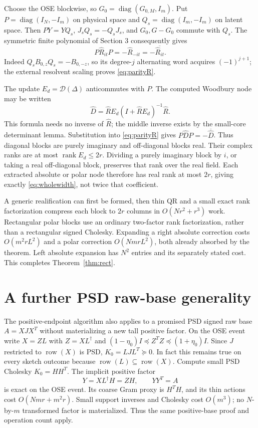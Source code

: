 \documentclass[11pt]{article}
\numberwithin{equation}{section}
\newcommand{\rank}{\operatorname{rank}}
\newcommand{\diag}{\operatorname{diag}}
\begin{document}
Choose the OSE blockwise, so
$G_0=\diag(G_{0,M},I_m)$. Put
$P=\diag(I_N,-I_m)$ on physical space and
$Q_s=\diag(I_m,-I_m)$ on latent space. Then $PY=YQ_s$,
$J_sQ_s=-Q_sJ_s$, and $G_0,G-G_0$ commute with $Q_s$.
The symmetric finite polynomial of Section 3 consequently gives
\begin{equation}\label{eq:parityR}
 P\widehat R_{it}P=-\widehat R_{-it}
                       =-\overline{\widehat R_{it}}.
\end{equation}
Indeed $Q_sB_{0,z}Q_s=-B_{0,-z}$, so its degree-$j$ alternating word
acquires $(-1)^{j+1}$; the external resolvent scaling proves
\eqref{eq:parityR}.

The update $E_d=\mathcal D(\Delta)$ anticommutes with $P$. The computed
Woodbury node may be written
\[
 \widehat D=\widehat R E_d(I+\widehat R E_d)^{-1}\widehat R.
\]
This formula needs no inverse of $\widehat R$; the middle inverse
exists by the small-core determinant lemma. Substitution into
\eqref{eq:parityR} gives $P\widehat DP=-\overline{\widehat D}$.
Thus diagonal blocks are purely imaginary and off-diagonal blocks real.
Their complex ranks are at most $\rank E_d\le2r$. Dividing a purely
imaginary block by $i$, or taking a real off-diagonal block, preserves
that rank over the real field. Each extracted absolute or polar node
therefore has real rank at most $2r$, giving exactly
\eqref{eq:wholewidth}, not twice that coefficient.

A generic realification can first be formed, then thin QR and a small
exact rank factorization compress each block to $2r$ columns in
$O(Nr^2+r^3)$ work. Rectangular polar blocks use an ordinary two-factor
rank factorization, rather than a rectangular signed Cholesky.
Expanding a right absolute correction costs $O(m^2rL^2)$ and a polar
correction $O(NmrL^2)$, both already absorbed by the theorem. Left
absolute expansion has $N^2$ entries and its separately stated cost.
This completes Theorem~\ref{thm:rect}.

\section{A further PSD raw-base generality}

The positive-endpoint algorithm also applies to a promised PSD signed
raw base $A=XJX^T$ without materializing a new tall positive factor.
On the OSE event write $X=ZL$ with $Z=XL^\dagger$ and
$(1-\eta_0)I\preceq Z^TZ\preceq(1+\eta_0)I$.
Since $J$ restricted to $\operatorname{row}(X)$ is PSD,
$K_0=LJL^T\succeq0$. In fact this remains true on every sketch
outcome because $\operatorname{row}(L)\subseteq\operatorname{row}(X)$.
Compute small PSD Cholesky $K_0=HH^T$. The implicit positive factor
\[
 Y=XL^\dagger H=ZH,\qquad YY^T=A
\]
is exact on the OSE event. Its coarse Gram proxy is $H^TH$, and its
thin actions cost $O(Nmr+m^2r)$. Small support inverses and Cholesky
cost $O(m^3)$; no $N$-by-$m$ transformed factor is materialized.
Thus the same positive-base proof and operation count apply.
\end{document}
